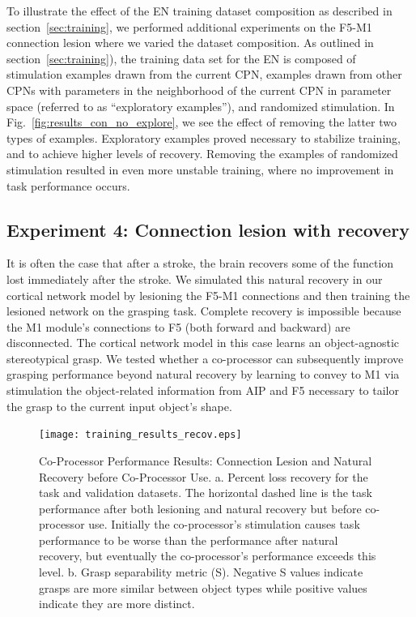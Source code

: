 \documentclass[12pt]{iopart}
\begin{document}
To illustrate the effect of the EN training dataset composition as described in section~\ref{sec:training}, we
performed additional experiments on the F5-M1 connection lesion where we varied the dataset composition. As
outlined in section~\ref{sec:training}), the training data set for the EN is composed of stimulation examples
drawn from the current CPN, examples drawn from other CPNs with parameters in the neighborhood of the current
CPN in parameter space (referred to as ``exploratory examples''), and randomized stimulation. In
Fig.~\ref{fig:results_con_no_explore}, we see the effect of removing the latter two types of examples.
Exploratory examples proved necessary to stabilize training, and to achieve higher levels of recovery. Removing
the examples of randomized stimulation resulted in even more unstable training, where no improvement in task
performance occurs.

\subsection{Experiment 4: Connection lesion with recovery}
It is often the case that after a stroke, the brain recovers some of the function lost immediately after the
stroke. We simulated this natural recovery in our cortical  network model by lesioning the F5-M1 connections
and then training the lesioned network on the grasping task. Complete recovery is impossible because the M1 module's
connections to F5 (both forward and backward) are disconnected. The cortical network model in this case learns
an object-agnostic stereotypical grasp. We tested whether a co-processor can subsequently improve grasping performance
beyond natural recovery by learning to convey to M1 via stimulation the object-related information from AIP and F5
necessary to tailor the grasp to the current input object's shape.

\begin{figure}[h]
\centering
\texttt{[image: training\_results\_recov.eps]}
\caption{Co-Processor Performance Results: Connection Lesion and Natural Recovery before Co-Processor Use.
         a. Percent loss recovery for the task and validation datasets. The horizontal dashed line is the task
         performance after both lesioning and natural recovery but before co-processor use. Initially the
         co-processor's stimulation causes task performance to be worse than the performance after natural
         recovery, but eventually the co-processor's performance exceeds this level. b. Grasp separability
         metric (S). Negative S values indicate grasps are more similar between object types while positive values
        indicate they are more distinct.
        }
\label{fig:results_recov}
\end{figure}
\end{document}
